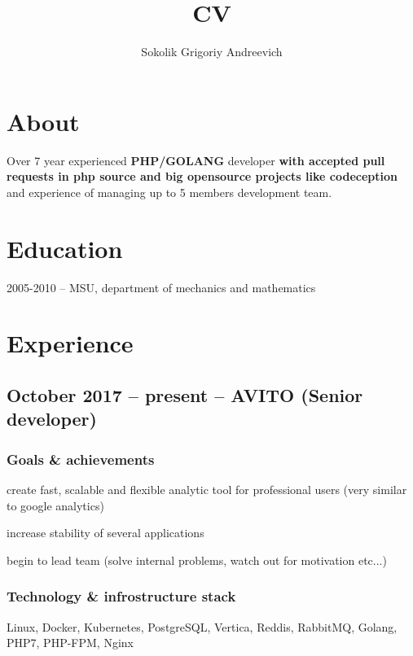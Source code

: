 \documentclass[9pt, a4paper, english]{extarticle}
\title {CV}
\author{Sokolik Grigoriy Andreevich}
\begin{document}
\maketitle

\section* {About}
Over 7 year experienced \textbf{PHP/GOLANG} developer \textbf{with accepted pull requests in php source and big opensource projects like codeception} and experience of managing up to 5 members development team.

\section* {Education}
2005-2010 -- MSU, department of mechanics and mathematics


\section* {Experience}

  \subsection* {October 2017 -- present -- \textbf{AVITO} (Senior developer)}
    \subsubsection* {Goals \& achievements}
      \begin {list}{\textbullet}{\itemsep=0mm}
        \item create fast, scalable and flexible analytic tool for professional users (very similar to google analytics)
        \item increase stability of several applications
        \item begin to lead team (solve internal problems, watch out for motivation etc...)
      \end{list}
    \subsubsection* {Technology \& infrostructure stack}
      Linux, Docker, Kubernetes, PostgreSQL, Vertica, Reddis, RabbitMQ, Golang, PHP7, PHP-FPM, Nginx
\end{document}
